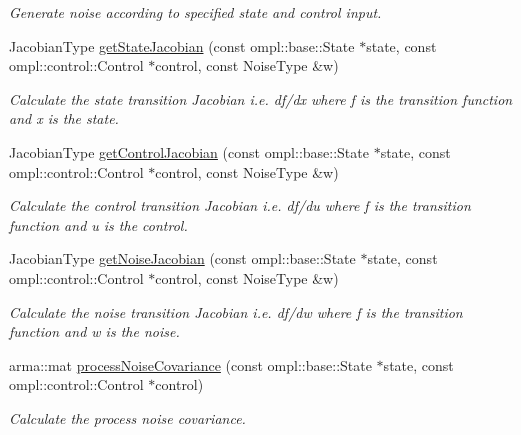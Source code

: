 \begin{DoxyCompactItemize}
\begin{DoxyCompactList}\small\item\em \-Generate noise according to specified state and control input. \end{DoxyCompactList}\item 
\hypertarget{class_unicycle_motion_model_adb849fef38055401851adf4e87e8ec23}{\-Jacobian\-Type \hyperlink{class_unicycle_motion_model_adb849fef38055401851adf4e87e8ec23}{get\-State\-Jacobian} (const ompl\-::base\-::\-State $\ast$state, const ompl\-::control\-::\-Control $\ast$control, const \-Noise\-Type \&w)}\label{class_unicycle_motion_model_adb849fef38055401851adf4e87e8ec23}

\begin{DoxyCompactList}\small\item\em \-Calculate the state transition \-Jacobian i.\-e. df/dx where f is the transition function and x is the state. \end{DoxyCompactList}\item 
\hypertarget{class_unicycle_motion_model_a422cbf49ce1b509e7f031008483bd6ff}{\-Jacobian\-Type \hyperlink{class_unicycle_motion_model_a422cbf49ce1b509e7f031008483bd6ff}{get\-Control\-Jacobian} (const ompl\-::base\-::\-State $\ast$state, const ompl\-::control\-::\-Control $\ast$control, const \-Noise\-Type \&w)}\label{class_unicycle_motion_model_a422cbf49ce1b509e7f031008483bd6ff}

\begin{DoxyCompactList}\small\item\em \-Calculate the control transition \-Jacobian i.\-e. df/du where f is the transition function and u is the control. \end{DoxyCompactList}\item 
\hypertarget{class_unicycle_motion_model_a62aa73b58447613c0745dab9453760b7}{\-Jacobian\-Type \hyperlink{class_unicycle_motion_model_a62aa73b58447613c0745dab9453760b7}{get\-Noise\-Jacobian} (const ompl\-::base\-::\-State $\ast$state, const ompl\-::control\-::\-Control $\ast$control, const \-Noise\-Type \&w)}\label{class_unicycle_motion_model_a62aa73b58447613c0745dab9453760b7}

\begin{DoxyCompactList}\small\item\em \-Calculate the noise transition \-Jacobian i.\-e. df/dw where f is the transition function and w is the noise. \end{DoxyCompactList}\item 
\hypertarget{class_unicycle_motion_model_a1ae47461abed522cc1d611a1f60b6f7c}{arma\-::mat \hyperlink{class_unicycle_motion_model_a1ae47461abed522cc1d611a1f60b6f7c}{process\-Noise\-Covariance} (const ompl\-::base\-::\-State $\ast$state, const ompl\-::control\-::\-Control $\ast$control)}\label{class_unicycle_motion_model_a1ae47461abed522cc1d611a1f60b6f7c}

\begin{DoxyCompactList}\small\item\em \-Calculate the process noise covariance. \end{DoxyCompactList}\end{DoxyCompactItemize}

